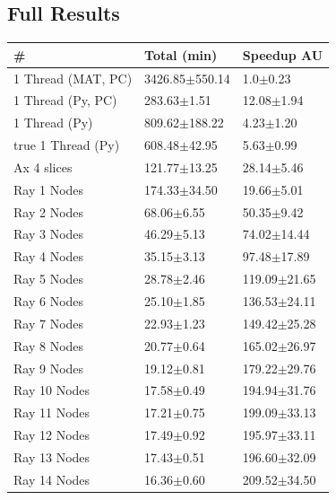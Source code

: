 \documentclass[12pt, a4paper]{article}
\begin{document}
\begin{appendices}

\section{Full Results}

\begin{table}[H]
    \centering
    \begin{tabular}{|l|l|l|}
    \hline
    \#                 & Total (min)        & Speedup AU       \\ \hline
    1 Thread (MAT, PC) & 3426.85$\pm$550.14 & 1.0$\pm$0.23     \\ 
    1 Thread (Py, PC)  & 283.63$\pm$1.51    & 12.08$\pm$1.94   \\ 
    1 Thread (Py)      & 809.62$\pm$188.22  & 4.23$\pm$1.20    \\ 
    true 1 Thread (Py) & 608.48$\pm$42.95   & 5.63$\pm$0.99    \\ 
    Ax 4 slices        & 121.77$\pm$13.25   & 28.14$\pm$5.46   \\ 
    Ray 1 Nodes        & 174.33$\pm$34.50   & 19.66$\pm$5.01   \\ 
    Ray 2 Nodes        & 68.06$\pm$6.55     & 50.35$\pm$9.42   \\ 
    Ray 3 Nodes        & 46.29$\pm$5.13     & 74.02$\pm$14.44  \\ 
    Ray 4 Nodes        & 35.15$\pm$3.13     & 97.48$\pm$17.89  \\ 
    Ray 5 Nodes        & 28.78$\pm$2.46     & 119.09$\pm$21.65 \\ 
    Ray 6 Nodes        & 25.10$\pm$1.85     & 136.53$\pm$24.11 \\ 
    Ray 7 Nodes        & 22.93$\pm$1.23     & 149.42$\pm$25.28 \\ 
    Ray 8 Nodes        & 20.77$\pm$0.64     & 165.02$\pm$26.97 \\ 
    Ray 9 Nodes        & 19.12$\pm$0.81     & 179.22$\pm$29.76 \\ 
    Ray 10 Nodes       & 17.58$\pm$0.49     & 194.94$\pm$31.76 \\ 
    Ray 11 Nodes       & 17.21$\pm$0.75     & 199.09$\pm$33.13 \\ 
    Ray 12 Nodes       & 17.49$\pm$0.92     & 195.97$\pm$33.11 \\ 
    Ray 13 Nodes       & 17.43$\pm$0.51     & 196.60$\pm$32.09 \\ 
    Ray 14 Nodes       & 16.36$\pm$0.60     & 209.52$\pm$34.50 \\ 

\end{tabular}
\end{table}
\end{appendices}
\end{document}
